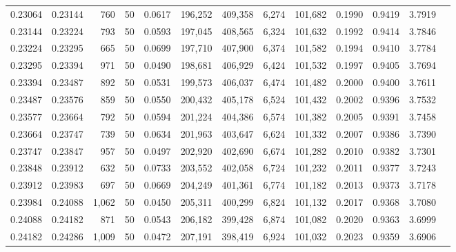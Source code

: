 \begin{tabular}{rrrrrrrrrrrrr}
0.23064 & 0.23144 &   760 &  50 &                                     0.0617 & 196,252 & 409,358 &   6,274 & 101,682 & 0.1990 & 0.9419 & 3.7919 \\
0.23144 & 0.23224 &   793 &  50 &                                     0.0593 & 197,045 & 408,565 &   6,324 & 101,632 & 0.1992 & 0.9414 & 3.7846 \\
0.23224 & 0.23295 &   665 &  50 &                                     0.0699 & 197,710 & 407,900 &   6,374 & 101,582 & 0.1994 & 0.9410 & 3.7784 \\
0.23295 & 0.23394 &   971 &  50 &                                     0.0490 & 198,681 & 406,929 &   6,424 & 101,532 & 0.1997 & 0.9405 & 3.7694 \\
0.23394 & 0.23487 &   892 &  50 &                                     0.0531 & 199,573 & 406,037 &   6,474 & 101,482 & 0.2000 & 0.9400 & 3.7611 \\
0.23487 & 0.23576 &   859 &  50 &                                     0.0550 & 200,432 & 405,178 &   6,524 & 101,432 & 0.2002 & 0.9396 & 3.7532 \\
0.23577 & 0.23664 &   792 &  50 &                                     0.0594 & 201,224 & 404,386 &   6,574 & 101,382 & 0.2005 & 0.9391 & 3.7458 \\
0.23664 & 0.23747 &   739 &  50 &                                     0.0634 & 201,963 & 403,647 &   6,624 & 101,332 & 0.2007 & 0.9386 & 3.7390 \\
0.23747 & 0.23847 &   957 &  50 &                                     0.0497 & 202,920 & 402,690 &   6,674 & 101,282 & 0.2010 & 0.9382 & 3.7301 \\
0.23848 & 0.23912 &   632 &  50 &                                     0.0733 & 203,552 & 402,058 &   6,724 & 101,232 & 0.2011 & 0.9377 & 3.7243 \\
0.23912 & 0.23983 &   697 &  50 &                                     0.0669 & 204,249 & 401,361 &   6,774 & 101,182 & 0.2013 & 0.9373 & 3.7178 \\
0.23984 & 0.24088 & 1,062 &  50 &                                     0.0450 & 205,311 & 400,299 &   6,824 & 101,132 & 0.2017 & 0.9368 & 3.7080 \\
0.24088 & 0.24182 &   871 &  50 &                                     0.0543 & 206,182 & 399,428 &   6,874 & 101,082 & 0.2020 & 0.9363 & 3.6999 \\
0.24182 & 0.24286 & 1,009 &  50 &                                     0.0472 & 207,191 & 398,419 &   6,924 & 101,032 & 0.2023 & 0.9359 & 3.6906 \\

\end{tabular}
